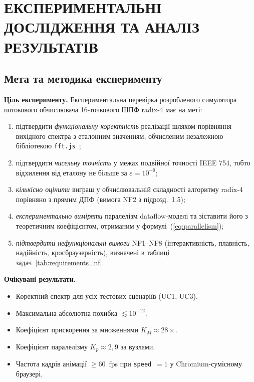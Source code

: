 \section{ЕКСПЕРИМЕНТАЛЬНІ ДОСЛІДЖЕННЯ ТА АНАЛІЗ РЕЗУЛЬТАТІВ}

\subsection{Мета та методика експерименту}

\textbf{Ціль експерименту.} Експериментальна перевірка розробленого
симулятора потокового обчислювача 16-точкового ШПФ radix-4 має на меті:

\begin{enumerate}
  \item підтвердити \emph{функціональну коректність} реалізації шляхом
    порівняння вихідного спектра з еталонним значенням, обчисленим
    незалежною бібліотекою \texttt{fft.js}~\cite{frigo2005};
  \item підтвердити \emph{чисельну точність} у межах подвійної точності
    IEEE 754, тобто відхилення від еталону не більше за $\varepsilon = 10^{-9}$;
  \item \emph{кількісно оцінити} виграш у обчислювальній складності
    алгоритму radix-4 порівняно з прямим ДПФ (вимога NF2 з підрозд.~1.5);
  \item \emph{експериментально виміряти} паралелізм dataflow-моделі та
    зіставити його з теоретичним коефіцієнтом, отриманим у
    формулі~(\ref{eq:parallelism});
  \item \emph{підтвердити нефункціональні вимоги} NF1--NF8
    (інтерактивність, плавність, надійність, кросбраузерність),
    визначені в таблиці задач~\ref{tab:requirements_nf}.
\end{enumerate}

\textbf{Очікувані результати.}
\begin{itemize}
  \item Коректний спектр для усіх тестових сценаріїв (UC1, UC3).
  \item Максимальна абсолютна похибка $\lesssim 10^{-12}$.
  \item Коефіцієнт прискорення за множеннями $K_M \approx 28\times$.
  \item Коефіцієнт паралелізму $K_p \approx 2{,}9$ за вузлами.
  \item Частота кадрів анімації $\geq 60$~fps при \texttt{speed}~$=1$
    у Chromium-сумісному браузері.
\end{itemize}

